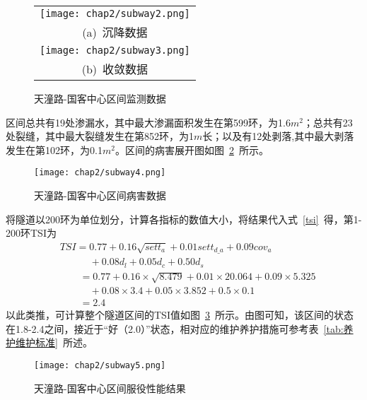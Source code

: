 \begin{figure}[htb!] 
    \centering 
    \begin{tabular}{c} 
        \texttt{[image: chap2/subway2.png]} \\ 
        (a)~沉降数据 \\
        \texttt{[image: chap2/subway3.png]} \\ 
        (b)~收敛数据 \\
    \end{tabular}
    \caption{天潼路-国客中心区间监测数据} 
    \label{fig:天潼路-国客中心区间监测数据} 
\end{figure}

区间总共有19处渗漏水，其中最大渗漏面积发生在第599环，为1.6$m^2$；总共有23处裂缝，其中最大裂缝发生在第852环，为1$m$长；以及有12处剥落,其中最大剥落发生在第102环，为0.1$m^2$。区间的病害展开图如图~\ref{fig:天潼路-国客中心区间病害数据}~所示。

\begin{figure}[htb!]
    \centering
    \texttt{[image: chap2/subway4.png]}
    \caption{天潼路-国客中心区间病害数据}
    \label{fig:天潼路-国客中心区间病害数据}
\end{figure}

将隧道以200环为单位划分，计算各指标的数值大小，将结果代入式~\ref{tsi}~得，第1-200环TSI为
\begin{align}
  & TSI=0.77+0.16\sqrt{{{sett}_{a}}}+0.01{{sett}_{d\_a}}+0.09{{cov}_{a}} \nonumber \\ 
 & \quad \quad \quad +0.08{{d}_{l}}+0.05{{d}_{c}}+0.50{{d}_{s}} \nonumber \\ 
 & \quad \quad =0.77+0.16\times \sqrt{8.479}+0.01\times 20.064+0.09\times 5.325 \nonumber \\ 
 & \quad \quad \quad +0.08\times 3.4+0.05\times 3.852+0.5\times 0.1 \nonumber \\ 
 & \quad \quad =2.4 \nonumber
\end{align}
以此类推，可计算整个隧道区间的TSI值如图~\ref{fig:天潼路-国客中心区间服役性能结果}~所示。由图可知，该区间的状态在1.8-2.4之间，接近于“好（2.0）”状态，相对应的维护养护措施可参考表~\ref{tab:养护维护标准}~所述。

\begin{figure}[htb!]
    \centering
    \texttt{[image: chap2/subway5.png]}
    \caption{天潼路-国客中心区间服役性能结果}
    \label{fig:天潼路-国客中心区间服役性能结果}
\end{figure}


